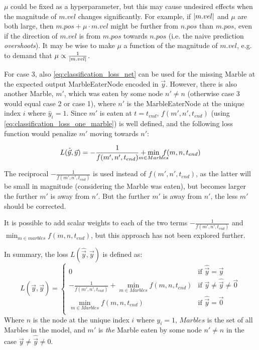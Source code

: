 $\mu$ could be fixed as a hyperparameter, but this may cause undesired effects when the  magnitude of $m.vel$ changes significantly. For example, if $\lvert m.vel \rvert$ and $\mu$ are both large, then $m.pos + \mu \cdot m.vel$ might be further from $n.pos$ than $m.pos$, even if the direction of $m.vel$ is from $m.pos$ towards $n.pos$ (i.e. the naive prediction \textit{overshoots}). It may be wise to make $\mu$ a function of the magnitude of $m.vel$, e.g. to demand that $\mu \propto \frac{1}{\lvert m.vel \rvert}$.

For case 3, also \eqref{eq:classification_loss_net} can be used for the missing Marble at the expected output MarbleEaterNode encoded in $\vec{y}$. However, there is also another Marble, $m'$, which was eaten by some node $n' \neq n$ (otherwise case 3 would equal case 2 or case 1), where $n'$ is the MarbleEaterNode at the unique index $i$ where $\hat{y}_i = 1$. Since $m'$ is eaten at $t = t_{end}$, $f(m', n', t_{end})$ (using \eqref{eq:classification_loss_one_marble}) is well defined, and the following loss function would penalize $m'$ moving towards $n'$:

\begin{equation}
    L(\hat{\vec{y}}, \vec{y}) = - \frac{1}{f(m', n', t_{end})} + \smashoperator{\min_{m \in Marbles}} \; f(m, n, t_{end})
\end{equation}

The reciprocal $- \frac{1}{f(m', n', t_{end})}$ is used instead of $f(m', n', t_{end})$, 
as the latter will be small in magnitude (considering the Marble was eaten), 
but becomes larger the further $m'$ is away from $n'$. 
But the further $m'$ is away from $n'$, the less $m'$ should be corrected.

It is possible to add scalar weights to each of the two terms 
$- \frac{1}{f(m', n', t_{end})}$ and $\min_{m \in marbles} f(m, n, t_{end})$, 
but this approach has not been explored further.

In summary, the loss $L(\hat{\vec{y}}, \vec{y})$ is defined as:
\begin{equation}
    L(\hat{\vec{y}}, \vec{y}) = \begin{cases}
        0 & \text{if } \hat{\vec{y}} = \vec{y} \\
        - \frac{1}{f(m', n', t_{end})} + \min_{m \in Marbles} f(m, n, t_{end}) & \text{if } \vec{y} \neq \hat{\vec{y}} \neq \vec{0}  \\
        \min_{m \in Marbles} f(m, n, t_{end}) & \text{if } \hat{\vec{y}} = \vec{0}\\
    \end{cases}
    \label{eq:classification_loss_full}
\end{equation}
Where $n$ is the node at the unique index $i$ where $y_i = 1$, $Marbles$ is the set of all Marbles in the model, and $m'$ is \textit{the} Marble eaten by some node $n' \neq n$ in the case $\vec{y} \neq \hat{\vec{y}} \neq 0$.

